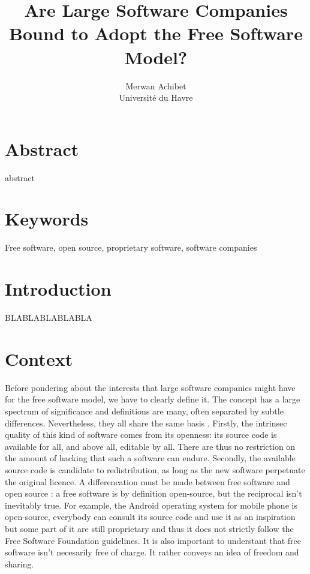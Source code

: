 \documentclass[12pt]{article}
\title{Are Large Software Companies Bound to Adopt the Free Software Model?}
\author{Merwan Achibet\\Université du Havre}
\date{}
\begin{document}
\maketitle
\newpage

\tableofcontents
\newpage

\section*{Abstract}

abstract

\section*{Keywords}

Free software, open source, proprietary software, software companies

\newpage

\section*{Introduction}

BLABLABLABLABLA

\section{Context}

Before pondering about the interests that large software companies
might have for the free software model, we have to clearly define
it. The concept has a large spectrum of significance and definitions
are many, often separated by subtle differences. Nevertheless, they
all share the same basis \cite{sers}. Firstly, the intrinsec quality
of this kind of software comes from its openness: its source code is
available for all, and above all, editable by all. There are thus no
restriction on the amount of hacking that such a software can endure. Secondly,
the available source code is candidate to redistribution, as long as
the new software perpetuate the original licence. A differencation must
be made between free software and open source : a free software is by
definition open-source, but the reciprocal isn't inevitably true. For
example, the Android operating system for mobile phone is open-source,
everybody can consult its source code and use it as an
inspiration but some part of it are still proprietary and thus it does not strictly follow the
Free Software Foundation guidelines. It is also important to understant that free software isn't
necesarily free of charge. It rather conveys an idea of freedom and sharing.
\end{document}
